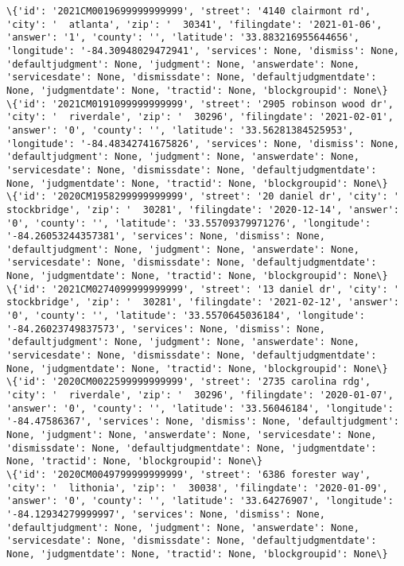 \documentclass[11pt]{article}
\begin{document}
\begin{Verbatim}[commandchars=\\\{\}]
\{'id': '2021CM0019699999999999', 'street': '4140 clairmont rd', 'city': '  atlanta', 'zip': '  30341', 'filingdate': '2021-01-06', 'answer': '1', 'county': '', 'latitude': '33.883216955644656', 'longitude': '-84.30948029472941', 'services': None, 'dismiss': None, 'defaultjudgment': None, 'judgment': None, 'answerdate': None, 'servicesdate': None, 'dismissdate': None, 'defaultjudgmentdate': None, 'judgmentdate': None, 'tractid': None, 'blockgroupid': None\}
\{'id': '2021CM0191099999999999', 'street': '2905 robinson wood dr', 'city': '  riverdale', 'zip': '  30296', 'filingdate': '2021-02-01', 'answer': '0', 'county': '', 'latitude': '33.56281384525953', 'longitude': '-84.48342741675826', 'services': None, 'dismiss': None, 'defaultjudgment': None, 'judgment': None, 'answerdate': None, 'servicesdate': None, 'dismissdate': None, 'defaultjudgmentdate': None, 'judgmentdate': None, 'tractid': None, 'blockgroupid': None\}
\{'id': '2020CM1958299999999999', 'street': '20 daniel dr', 'city': '  stockbridge', 'zip': '  30281', 'filingdate': '2020-12-14', 'answer': '0', 'county': '', 'latitude': '33.55709379971276', 'longitude': '-84.26053244357381', 'services': None, 'dismiss': None, 'defaultjudgment': None, 'judgment': None, 'answerdate': None, 'servicesdate': None, 'dismissdate': None, 'defaultjudgmentdate': None, 'judgmentdate': None, 'tractid': None, 'blockgroupid': None\}
\{'id': '2021CM0274099999999999', 'street': '13 daniel dr', 'city': '  stockbridge', 'zip': '  30281', 'filingdate': '2021-02-12', 'answer': '0', 'county': '', 'latitude': '33.5570645036184', 'longitude': '-84.26023749837573', 'services': None, 'dismiss': None, 'defaultjudgment': None, 'judgment': None, 'answerdate': None, 'servicesdate': None, 'dismissdate': None, 'defaultjudgmentdate': None, 'judgmentdate': None, 'tractid': None, 'blockgroupid': None\}
\{'id': '2020CM0022599999999999', 'street': '2735 carolina rdg', 'city': '  riverdale', 'zip': '  30296', 'filingdate': '2020-01-07', 'answer': '0', 'county': '', 'latitude': '33.56046184', 'longitude': '-84.47586367', 'services': None, 'dismiss': None, 'defaultjudgment': None, 'judgment': None, 'answerdate': None, 'servicesdate': None, 'dismissdate': None, 'defaultjudgmentdate': None, 'judgmentdate': None, 'tractid': None, 'blockgroupid': None\}
\{'id': '2020CM0049799999999999', 'street': '6386 forester way', 'city': '  lithonia', 'zip': '  30038', 'filingdate': '2020-01-09', 'answer': '0', 'county': '', 'latitude': '33.64276907', 'longitude': '-84.12934279999997', 'services': None, 'dismiss': None, 'defaultjudgment': None, 'judgment': None, 'answerdate': None, 'servicesdate': None, 'dismissdate': None, 'defaultjudgmentdate': None, 'judgmentdate': None, 'tractid': None, 'blockgroupid': None\}

\end{Verbatim}
\end{document}

